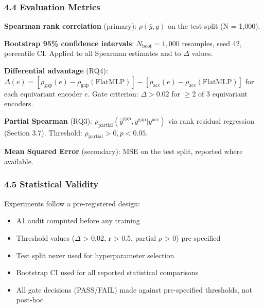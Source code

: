 \subsubsection{4.4 Evaluation Metrics}

\textbf{Spearman rank correlation} (primary): $\rho(\hat{y}, y)$ on the test split (N = 1,000).

\textbf{Bootstrap 95\% confidence intervals}: $N_{\text{boot}} = 1{,}000$ resamples, seed 42, percentile CI.
Applied to all Spearman estimates and to $\Delta$ values.

\textbf{Differential advantage} (RQ4): $\Delta(e) = [\rho_{\text{gap}}(e) - \rho_{\text{gap}}(\text{FlatMLP})] - [\rho_{\text{acc}}(e) - \rho_{\text{acc}}(\text{FlatMLP})]$ for each equivariant encoder $e$.
Gate criterion: $\Delta > 0.02$ for $\geq 2$ of 3 equivariant encoders.

\textbf{Partial Spearman} (RQ3): $\rho_{\text{partial}}(\hat{y}^{\text{gap}}, y^{\text{gap}} | y^{\text{acc}})$
via rank residual regression (Section 3.7). Threshold: $\rho_{\text{partial}} > 0, p < 0.05$.

\textbf{Mean Squared Error} (secondary): MSE on the test split, reported where available.

\subsubsection{4.5 Statistical Validity}

Experiments follow a pre-registered design:
\begin{itemize}
\item A1 audit computed before any training
\item Threshold values ($\Delta$ > 0.02, r > 0.5, partial $\rho$ > 0) pre-specified
\item Test split never used for hyperparameter selection
\item Bootstrap CI used for all reported statistical comparisons
\item All gate decisions (PASS/FAIL) made against pre-specified thresholds, not post-hoc
\end{itemize}

